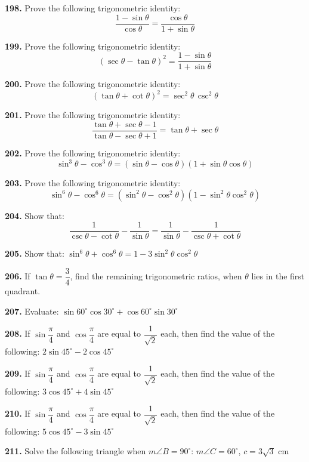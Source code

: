 \documentclass[11pt]{article}
\begin{document}
\noindent\textbf{198.} Prove the following trigonometric identity:
\[
\frac{1-\sin\theta}{\cos\theta} = \frac{\cos\theta}{1+\sin\theta}
\]

\bigskip
\noindent\textbf{199.} Prove the following trigonometric identity:
\[
(\sec\theta - \tan\theta)^2 = \frac{1-\sin\theta}{1+\sin\theta}
\]

\bigskip
\noindent\textbf{200.} Prove the following trigonometric identity:
\[
(\tan\theta + \cot\theta)^2 = \sec^2\theta \, \csc^2\theta
\]

\bigskip
\noindent\textbf{201.} Prove the following trigonometric identity:
\[
\frac{\tan\theta + \sec\theta - 1}{\tan\theta - \sec\theta + 1} = \tan\theta + \sec\theta
\]

\bigskip
\noindent\textbf{202.} Prove the following trigonometric identity:
\[
\sin^3\theta - \cos^3\theta = (\sin\theta - \cos\theta)(1+\sin\theta\cos\theta)
\]

\bigskip
\noindent\textbf{203.} Prove the following trigonometric identity:
\[
\sin^6\theta - \cos^6\theta = (\sin^2\theta - \cos^2\theta)(1-\sin^2\theta\cos^2\theta)
\]

\bigskip
\noindent\textbf{204.} Show that:
\[
\frac{1}{\csc\theta - \cot\theta} - \frac{1}{\sin\theta} = \frac{1}{\sin\theta} - \frac{1}{\csc\theta + \cot\theta}
\]

\bigskip
\noindent\textbf{205.} Show that: $\sin^6\theta + \cos^6\theta = 1 - 3\sin^2\theta\cos^2\theta$

\bigskip
\noindent\textbf{206.} If $\tan\theta = \dfrac{3}{4}$, find the remaining trigonometric ratios, when $\theta$ lies in the first quadrant.

\bigskip
\noindent\textbf{207.} Evaluate: $\sin 60^{\circ}\cos 30^{\circ} + \cos 60^{\circ}\sin 30^{\circ}$

\bigskip
\noindent\textbf{208.} If $\sin\dfrac{\pi}{4}$ and $\cos\dfrac{\pi}{4}$ are equal to $\dfrac{1}{\sqrt{2}}$ each, then find the value of the following: $2\sin 45^{\circ} - 2\cos 45^{\circ}$

\bigskip
\noindent\textbf{209.} If $\sin\dfrac{\pi}{4}$ and $\cos\dfrac{\pi}{4}$ are equal to $\dfrac{1}{\sqrt{2}}$ each, then find the value of the following: $3\cos 45^{\circ} + 4\sin 45^{\circ}$

\bigskip
\noindent\textbf{210.} If $\sin\dfrac{\pi}{4}$ and $\cos\dfrac{\pi}{4}$ are equal to $\dfrac{1}{\sqrt{2}}$ each, then find the value of the following: $5\cos 45^{\circ} - 3\sin 45^{\circ}$

\bigskip
\noindent\textbf{211.} Solve the following triangle when $m\angle B = 90^{\circ}$: $m\angle C = 60^{\circ}$, $c = 3\sqrt{3}$ cm
\end{document}

